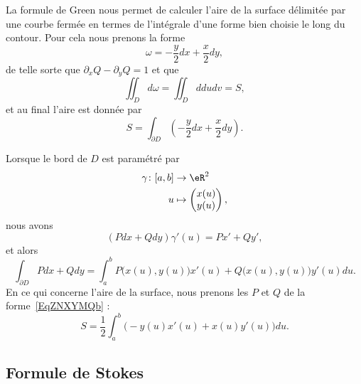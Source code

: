 La formule de Green nous permet de calculer l'aire de la surface délimitée par une courbe fermée en termes de l'intégrale d'une forme bien choisie le long du contour. Pour cela nous prenons la forme
\begin{equation}    \label{EqZNXYMQb}
	\omega=-\frac{ y }{2}dx+\frac{ x }{2}dy,
\end{equation}
de telle sorte que \( \partial_xQ-\partial_yQ=1\) et que
\begin{equation}
	\iint_Dd\omega=\iint_Dddudv=S,
\end{equation}
et au final l'aire est donnée par
\begin{equation}
	S=\int_{\partial D}\left( -\frac{ y }{2}dx+\frac{ x }{2}dy \right).
\end{equation}

Lorsque le bord de \( D\) est paramétré par
\begin{equation}
	\begin{aligned}
		\gamma\colon \mathopen[ a , b \mathclose] & \to \eR^2                            \\
		u                                         & \mapsto \begin{pmatrix}
			x(u) \\
			y(u)
		\end{pmatrix},
	\end{aligned}
\end{equation}
nous avons
\begin{equation}
	(Pdx+Qdy)\gamma'(u)=Px'+Qy',
\end{equation}
et alors
\begin{equation}
	\int_{\partial D}Pdx+Qdy=\int_a^b P\big( x(u),y(u) \big)x'(u)+Q\big( x(u),y(u) \big)y'(u)du.
\end{equation}
En ce qui concerne l'aire de la surface, nous prenons les \( P\) et \( Q\) de la forme~\ref{EqZNXYMQb} :
\begin{equation}    \label{EqAJGrtOk}
	S=\frac{ 1 }{2}\int_a^b\Big( -y(u)x'(u)+x(u)y'(u) \Big)du.
\end{equation}

\subsection{Formule de Stokes}
\label{secstokesusuel}

